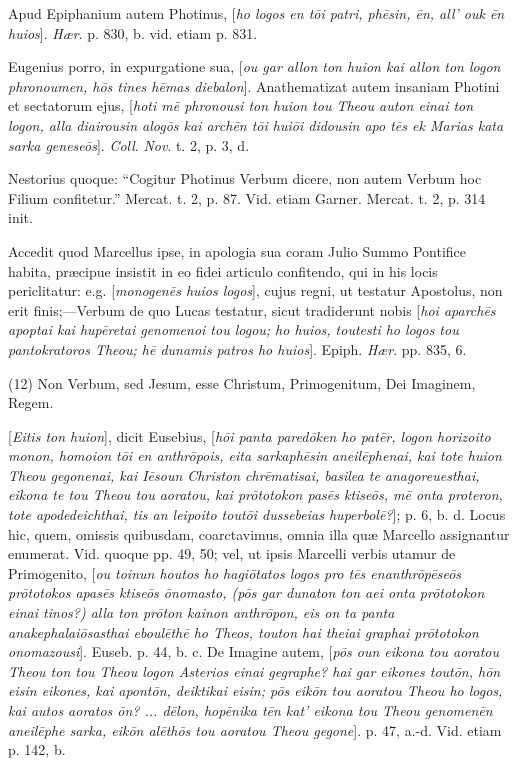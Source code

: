 Apud
Epiphanium autem Photinus, [\emph{ho logos en t\={o}i patri, ph\={e}sin,
\={e}n, all' ouk \={e}n huios}]. \emph{Hær}. p. 830, b. vid.
etiam p. 831.

Eugenius
porro, in expurgatione sua, [\emph{ou gar allon ton huion kai allon ton
logon phronoumen, h\={o}s tines h\={e}mas diebalon}].
Anathematizat autem insaniam Photini et sectatorum ejus, [\emph{hoti m\={e}
phronousi ton huion tou Theou auton einai ton logon, alla diairousin
alog\={o}s kai arch\={e}n t\={o}i hui\={o}i didousin apo t\={e}s
ek Marias kata sarka genese\={o}s}]. \emph{Coll}. \emph{Nov}. t.
2, p. 3, d.

Nestorius quoque: ``Cogitur
Photinus Verbum dicere, non autem Verbum hoc Filium confitetur.''
Mercat. t. 2, p. 87. Vid. etiam Garner. Mercat. t. 2, p. 314 init.

Accedit quod Marcellus ipse,
in apologia sua coram Julio Summo Pontifice habita, præcipue insistit
in eo fidei articulo confitendo, qui in his locis periclitatur: e.g.
[\emph{monogen\={e}s huios logos}], cujus regni, ut testatur
Apostolus, non erit finis;—Verbum de quo Lucas testatur, sicut
tradiderunt nobis [\emph{hoi aparch\={e}s apoptai kai hup\={e}retai
genomenoi tou logou; ho huios, toutesti ho logos tou pantokratoros
Theou; h\={e} dunamis patros ho huios}]. Epiph. \emph{Hær}. pp.
835, 6.

(12)
Non Verbum, sed Jesum, esse Christum, Primogenitum, Dei Imaginem,
Regem.

[\emph{Eitis
ton huion}], dicit Eusebius, [\emph{h\={o}i panta pared\={o}ken
ho pat\={e}r, logon horizoito monon, homoion t\={o}i en anthr\={o}pois,
eita sarka}\emph{ph\={e}sin} \emph{aneil\={e}phenai, kai
tote huion Theou gegonenai, kai I\={e}soun Christon chr\={e}matisai,
basilea te anagoreuesthai, eikona te tou Theou tou aoratou, kai pr\={o}totokon
pas\={e}s ktise\={o}s, m\={e} onta proteron, tote
apodedeichthai, tis an leipoito tout\={o}i dussebeias huperbol\={e}?}];
p. 6, b. d. Locus hic, quem, omissis quibusdam, coarctavimus, omnia
illa quæ Marcello assignantur enumerat. Vid. quoque pp. 49, 50; vel,
ut ipsis Marcelli verbis utamur de Primogenito, [\emph{ou toinun houtos
ho hagi\={o}tatos logos pro t\={e}s enanthr\={o}p\={e}se\={o}s
pr\={o}totokos apas\={e}s ktise\={o}s \={o}nomasto, (p\={o}s
gar dunaton ton aei onta pr\={o}totokon einai tinos?) alla ton pr\={o}ton
kainon anthr\={o}pon, eis on ta panta anakephalai\={o}sasthai
eboul\={e}th\={e} ho Theos, touton hai theiai graphai pr\={o}totokon
onomazousi}]. Euseb. p. 44, b. c. De Imagine autem, [\emph{p\={o}s
oun eikona tou aoratou Theou ton tou Theou logon Asterios einai
gegraphe? hai gar eikones tout\={o}n, h\={o}n eisin eikones, kai
apont\={o}n, deiktikai eisin; p\={o}s eik\={o}n tou aoratou
Theou ho logos, kai autos aoratos \={o}n? ... d\={e}lon, hop\={e}nika
t\={e}n kat' eikona tou Theou genomen\={e}n aneil\={e}phe
sarka, eik\={o}n al\={e}th\={o}s tou aoratou Theou gegone}].
p. 47, a.-d. Vid. etiam p. 142, b.

